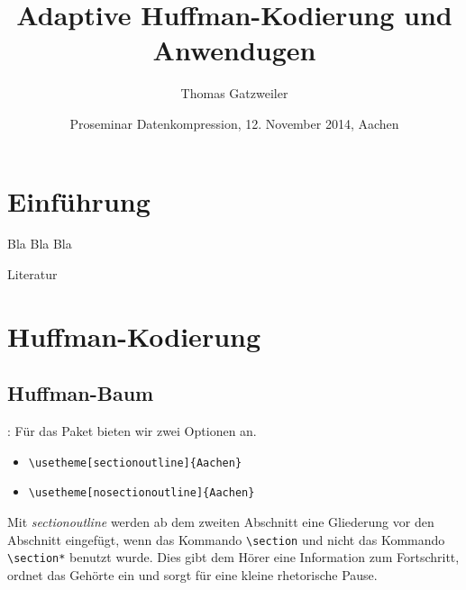 \documentclass[xcolor=table,presentation]{beamer}    %
\title[Adaptive Huffman-Kodierung und Anwendungen]{Adaptive Huffman-Kodierung und Anwendugen}
\author[Gatzweiler]{Thomas Gatzweiler}
\institute[RWTH Aachen University] %
{
  \strut Human Language Technology and Pattern Recognition\\
  \strut Computer Science Department, RWTH Aachen University %
}
\date[12. November 2014]{Proseminar Datenkompression, 12. November 2014, Aachen}
\begin{document}
\nocite{*}

\begin{frame}[label=titlepage]
  \titlepage
\end{frame}


%


\section{Einführung} \label{sec:intro}
\begin{frame}{\insertsection}
Bla Bla Bla
\end{frame}


\begin{frame}[allowframebreaks]{Literatur}
 
 
\end{frame}


\section{Huffman-Kodierung}

\subsection{Huffman-Baum}
\begin{frame}[fragile]{\insertsection: \insertsubsection}
Für das Paket bieten wir zwei Optionen an.
 \begin{itemize}
  \item \verb+\usetheme[sectionoutline]{Aachen}+
  \item \verb+\usetheme[nosectionoutline]{Aachen}+
 \end{itemize}
Mit \emph{sectionoutline} werden ab dem zweiten Abschnitt eine Gliederung vor den Abschnitt
eingefügt, wenn das Kommando \verb+\section+ und nicht das Kommando \verb+\section*+ benutzt wurde.
Dies gibt dem Hörer eine Information zum Fortschritt, ordnet das Gehörte ein und sorgt für eine
kleine rhetorische Pause.
\end{frame}
\end{document}
